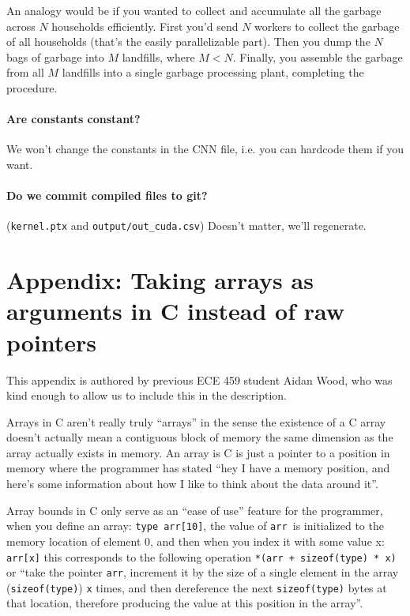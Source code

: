 An analogy would be if you wanted to collect and accumulate all the garbage across $N$ households efficiently. First you'd send $N$ workers to collect the garbage of all households (that's the easily parallelizable part). Then you dump the $N$ bags of garbage into $M$ landfills, where $M < N$. Finally, you assemble the garbage from all $M$ landfills into a single garbage processing plant, completing the procedure.

\paragraph{Are constants constant?} We won't change the constants in the CNN file, i.e. you can hardcode them if you want.

\paragraph{Do we commit compiled files to git?} (\verb+kernel.ptx+ and \verb+output/out_cuda.csv+) Doesn't matter, we'll regenerate.

\newpage
\section*{Appendix: Taking arrays as arguments in C instead of raw pointers}
This appendix is authored by previous ECE 459 student Aidan Wood, who was kind enough to allow us to include this in the description.

Arrays in C aren't really truly ``arrays'' in the sense the existence of a C array doesn't actually mean a contiguous block of memory the same dimension as the array actually exists in memory. An array is C is just a pointer to a position in memory where the programmer has stated ``hey I have a memory position, and here's some information about how I like to think about the data around it''. 

Array bounds in C only serve as an ``ease of use'' feature for the programmer, when you define an array: \texttt{type arr[10]}, the value of \texttt{arr }is initialized to the memory location of element 0, and then when you index it with some value x: \texttt{arr[x]} this corresponds to the following operation \texttt{*(arr + sizeof(type) * x)} or ``take the pointer \texttt{arr}, increment it by the size of a single element in the array (\texttt{sizeof(type)}) \texttt{x} times, and then dereference the next \texttt{sizeof(type)} bytes at that location, therefore producing the value at this position in the array''.

